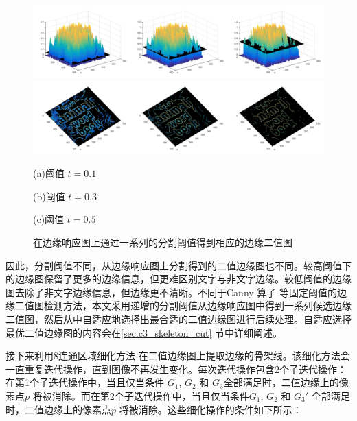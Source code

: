         \begin{figure}[htbp]
        \centering
        \includegraphics[width=\textwidth]{./figures/c3_edge_response.jpg}
        \includegraphics[width=\textwidth]{./figures/c3_edge_map.jpg}
        \begin{minipage}[t]{0.32\linewidth}
        \centerline{ \small (a)阈值 $t = 0.1$}
        \end{minipage}
        \begin{minipage}[t]{0.32\linewidth}
        \centerline{ \small (b)阈值 $t = 0.3$}
        \end{minipage}
        \begin{minipage}[t]{0.32\linewidth}
        \centerline{ \small (c)阈值 $t = 0.5$}
        \end{minipage}
        \caption{在边缘响应图上通过一系列的分割阈值得到相应的边缘二值图}
        \label{fig.c3_response_to_map}
        \end{figure}

        因此，分割阈值不同，从边缘响应图上分割得到的二值边缘图也不同。较高阈值下的边缘图保留了更多的边缘信息，但更难区别文字与非文字边缘。较低阈值的边缘图去除了非文字边缘信息，但边缘更不清晰。不同于Canny 算子\cite{Ding2001On} 等固定阈值的边缘二值图检测方法，本文采用递增的分割阈值从边缘响应图中得到一系列候选边缘二值图，然后从中自适应地选择出最合适的二值边缘图进行后续处理。自适应选择最优二值边缘图的内容会在\ref{sec.c3_skeleton_cut} 节中详细阐述。

        接下来利用8连通区域细化方法\cite{Lam2002Thinning} 在二值边缘图上提取边缘的骨架线。该细化方法会一直重复迭代操作，直到图像不再发生变化。每次迭代操作包含2个子迭代操作：在第1个子迭代操作中，当且仅当条件 $G_1$, $G_2$ 和 $G_3$全部满足时，二值边缘上的像素点$p$ 将被消除。而在第2个子迭代操作中，当且仅当条件$G_1$, $G_2$ 和 $G_3$$'$ 全部满足时，二值边缘上的像素点$p$ 将被消除。这些细化操作的条件如下所示：

